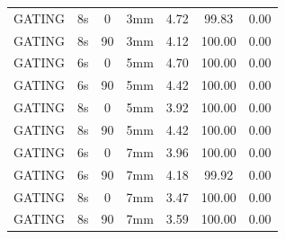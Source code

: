 \documentclass[type=dr, dr=rernat, accentcolor=tud7b,colorbacktitle, bigchapter, openright, twoside, 12pt ]{tudthesis}
\begin{document}
\begin{table}[H]
\begin{tabular}{|c||c|c|c||c|c|c|}
GATING & 8s & 0 & 3mm & 4.72 & 99.83 & 0.00 \\
GATING & 8s & 90 & 3mm & 4.12 & 100.00 & 0.00 \\
GATING & 6s & 0 & 5mm & 4.70 & 100.00 & 0.00 \\
GATING & 6s & 90 & 5mm & 4.42 & 100.00 & 0.00 \\
GATING & 8s & 0 & 5mm & 3.92 & 100.00 & 0.00 \\
GATING & 8s & 90 & 5mm & 4.42 & 100.00 & 0.00 \\
GATING & 6s & 0 & 7mm & 3.96 & 100.00 & 0.00 \\
GATING & 6s & 90 & 7mm & 4.18 & 99.92 & 0.00 \\
GATING & 8s & 0 & 7mm & 3.47 & 100.00 & 0.00 \\
GATING & 8s & 90 & 7mm & 3.59 & 100.00 & 0.00 \\
    \hline\hline 
  \end{tabular}
\end{table}

\newpage
\end{document}
